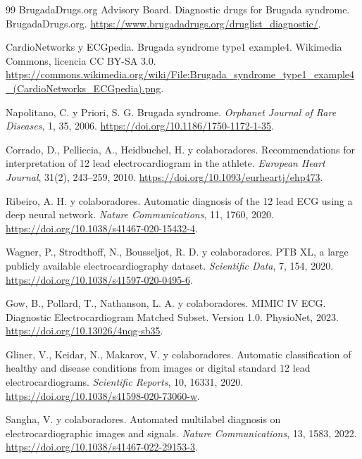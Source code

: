 \begin{thebibliography}{99}
BrugadaDrugs.org Advisory Board.
\newblock Diagnostic drugs for Brugada syndrome.
\newblock BrugadaDrugs.org.
\newblock \url{https://www.brugadadrugs.org/druglist_diagnostic/}.

CardioNetworks y ECGpedia.
\newblock Brugada syndrome type1 example4.
\newblock Wikimedia Commons, licencia CC BY-SA 3.0.
\newblock \url{https://commons.wikimedia.org/wiki/File:Brugada_syndrome_type1_example4_(CardioNetworks_ECGpedia).png}.

Napolitano, C. y Priori, S. G.
\newblock Brugada syndrome.
\newblock \emph{Orphanet Journal of Rare Diseases}, 1, 35, 2006.
\newblock \url{https://doi.org/10.1186/1750-1172-1-35}.

Corrado, D., Pelliccia, A., Heidbuchel, H. y colaboradores.
\newblock Recommendations for interpretation of 12 lead electrocardiogram in the athlete.
\newblock \emph{European Heart Journal}, 31(2), 243--259, 2010.
\newblock \url{https://doi.org/10.1093/eurheartj/ehp473}.

Ribeiro, A. H. y colaboradores.
\newblock Automatic diagnosis of the 12 lead ECG using a deep neural network.
\newblock \emph{Nature Communications}, 11, 1760, 2020.
\newblock \url{https://doi.org/10.1038/s41467-020-15432-4}.

Wagner, P., Strodthoff, N., Bousseljot, R. D. y colaboradores.
\newblock PTB XL, a large publicly available electrocardiography dataset.
\newblock \emph{Scientific Data}, 7, 154, 2020.
\newblock \url{https://doi.org/10.1038/s41597-020-0495-6}.

Gow, B., Pollard, T., Nathanson, L. A. y colaboradores.
\newblock MIMIC IV ECG. Diagnostic Electrocardiogram Matched Subset. Version 1.0.
\newblock PhysioNet, 2023.
\newblock \url{https://doi.org/10.13026/4nqg-sb35}.

Gliner, V., Keidar, N., Makarov, V. y colaboradores.
\newblock Automatic classification of healthy and disease conditions from images or digital standard 12 lead electrocardiograms.
\newblock \emph{Scientific Reports}, 10, 16331, 2020.
\newblock \url{https://doi.org/10.1038/s41598-020-73060-w}.

Sangha, V. y colaboradores.
\newblock Automated multilabel diagnosis on electrocardiographic images and signals.
\newblock \emph{Nature Communications}, 13, 1583, 2022.
\newblock \url{https://doi.org/10.1038/s41467-022-29153-3}.


\end{thebibliography}
